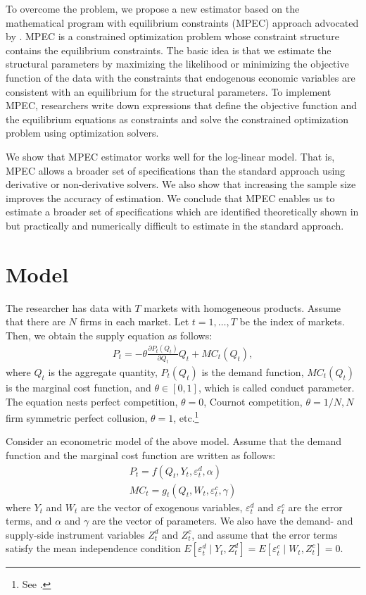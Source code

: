 \documentclass[11pt, a4paper]{article}
\begin{document}
To overcome the problem, we propose a new estimator based on the mathematical program with equilibrium constraints (MPEC) approach advocated by \cite{su2012constrained}. MPEC is a constrained optimization problem whose constraint structure contains the equilibrium constraints. The basic idea is that we estimate the structural parameters by maximizing the likelihood or minimizing the objective function of the data with the constraints that endogenous economic variables are consistent with an equilibrium for the structural parameters. To implement MPEC, researchers write down expressions that define the objective function and the equilibrium equations as constraints and solve the constrained optimization problem using optimization solvers. 

We show that MPEC estimator works well for the log-linear model. That is, MPEC allows a broader set of specifications than the standard approach using derivative or non-derivative solvers. We also show that increasing the sample size improves the accuracy of estimation. 
We conclude that MPEC enables us to estimate a broader set of specifications which are identified theoretically shown in \cite{lau1982identifying}  but practically and numerically difficult to estimate in the standard approach.


\section{Model}
The researcher has data with $T$ markets with homogeneous products.
Assume that there are $N$ firms in each market.
Let $t = 1,\ldots, T$ be the index of markets.
Then, we obtain the supply equation as follows:
\begin{align}
     P_t = -\theta\frac{\partial P_t(Q_{t})}{\partial Q_{t}}Q_{t} + MC_t(Q_{t}),\label{eq:supply_equation}
\end{align}
where $Q_{t}$ is the aggregate quantity, $P_t(Q_{t})$ is the demand function, $MC_{t}(Q_{t})$ is the marginal cost function, and $\theta\in[0,1]$, which is called conduct parameter. 
The equation nests perfect competition, $\theta=0$, Cournot competition, $\theta=1/N, N$ firm symmetric perfect collusion, $\theta=1$, etc.\footnote{See \cite{bresnahan1982oligopoly}.} 

Consider an econometric model of the above model.
Assume that the demand function and the marginal cost function are written as follows: 
\begin{align}
    P_t = f(Q_{t}, Y_t, \varepsilon^{d}_{t}, \alpha) \label{eq:demand}\\
    MC_t = g_{t}(Q_{t}, W_{t}, \varepsilon^{c}_{t}, \gamma)\label{eq:marginal_cost}
\end{align}
where $Y_t$ and $W_{t}$ are the vector of exogenous variables, $\varepsilon^{d}_{t}$ and $\varepsilon^{c}_{t}$ are the error terms, and $\alpha$ and $\gamma$ are the vector of parameters.
We also have the demand- and supply-side instrument variables $Z^{d}_{t}$ and $Z^{c}_{t}$, and assume that the error terms satisfy the mean independence condition $E[\varepsilon^{d}_{t}\mid Y_t, Z^{d}_{t}] = E[\varepsilon^{c}_{t} \mid W_{t}, Z^{c}_{t}] =0$.
\end{document}
